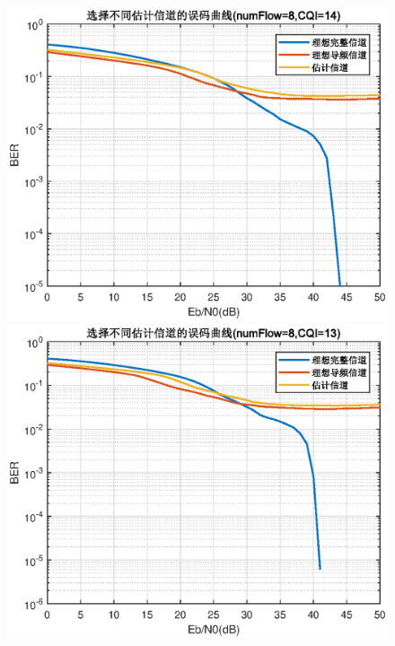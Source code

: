 \documentclass{article}
\begin{document}
\begin{figure}[H]
	\centering
	\begin{minipage}[t]{0.48\textwidth}
	\centering
	\includegraphics[width=\textwidth]{plot/plot_CQI14.eps}
	\end{minipage}
	\begin{minipage}[t]{0.48\textwidth}
	\centering
	\includegraphics[width=\textwidth]{plot/plot_CQI13.eps}
	\end{minipage}
\end{figure}
\end{document}
